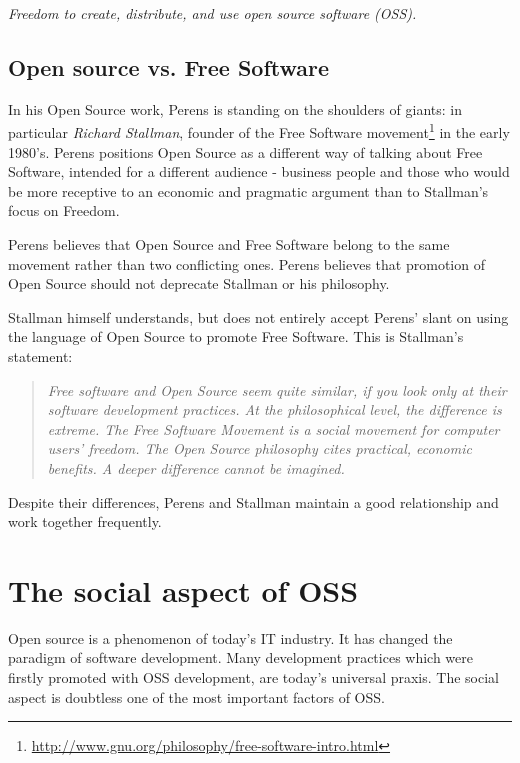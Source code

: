 \documentclass[times, utf8, seminar]{fit}
\begin{document}
\begin{center}
\emph{\large{Freedom to create, distribute, and use open source software (OSS).}}
\end{center}


\subsection{Open source vs. Free Software}

In his Open Source work, Perens is standing on the shoulders of giants: in particular \emph{Richard Stallman}, founder of the Free Software movement\footnote{\url{http://www.gnu.org/philosophy/free-software-intro.html}} in the early 1980’s. Perens positions Open Source as a different way of talking about Free Software, intended for a different audience - business people and those who would be more receptive to an economic and pragmatic argument than to Stallman's focus on Freedom\citep{web:perens}.

Perens believes that Open Source and Free Software belong to the same movement rather than two conflicting ones. Perens believes that promotion of Open Source should not deprecate Stallman or his philosophy.

Stallman himself understands, but does not entirely accept Perens' slant on using the language of Open Source to promote Free Software. This is Stallman's statement:

\begin{quotation}
\emph{Free software and Open Source seem quite similar, if you look only at their software development practices. At the philosophical level, the difference is extreme. The Free Software Movement is a social movement for computer users' freedom. The Open Source philosophy cites practical, economic benefits. A deeper difference cannot be imagined.}
\end{quotation}

Despite their differences, Perens and Stallman maintain a good relationship and work together frequently.

\section{The social aspect of OSS}

Open source is a phenomenon of today's IT industry. It has changed the paradigm of software development. Many development practices which were firstly promoted with OSS development, are today's universal praxis. The social aspect is doubtless one of the most important factors of OSS.
\end{document}
